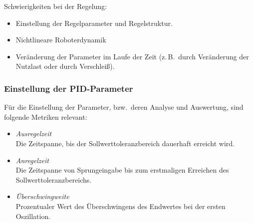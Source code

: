\documentclass[a4paper, 11pt, accentcolor = tud3b]{tudreport}
\newcommand{\bzw}{bzw.~}
\newcommand{\zB}{z.\,B.~}
\begin{document}
				Schwierigkeiten bei der Regelung:
				\begin{itemize}
					\item Einstellung der Regelparameter und Regelstruktur.
					\item Nichtlineare Roboterdynamik
					\item Veränderung der Parameter im Laufe der Zeit (\zB durch Veränderung der Nutzlast oder durch Verschleiß).
				\end{itemize}

				\subsubsection{Einstellung der PID-Parameter}
					Für die Einstellung der Parameter, \bzw deren Analyse und Auswertung, sind folgende Metriken relevant:
					\begin{itemize}
						\item \emph{Ausregelzeit} \\ Die Zeitspanne, bis der Sollwerttoleranzbereich dauerhaft erreicht wird.
						\item \emph{Anregelzeit} \\ Die Zeitspanne von Sprungeingabe bis zum erstmaligen Erreichen des Sollwerttoleranzbereichs.
						\item \emph{Überschwingweite} \\ Prozentualer Wert des Überschwingens des Endwertes bei der ersten Oszillation.
					\end{itemize}
				
\end{document}
